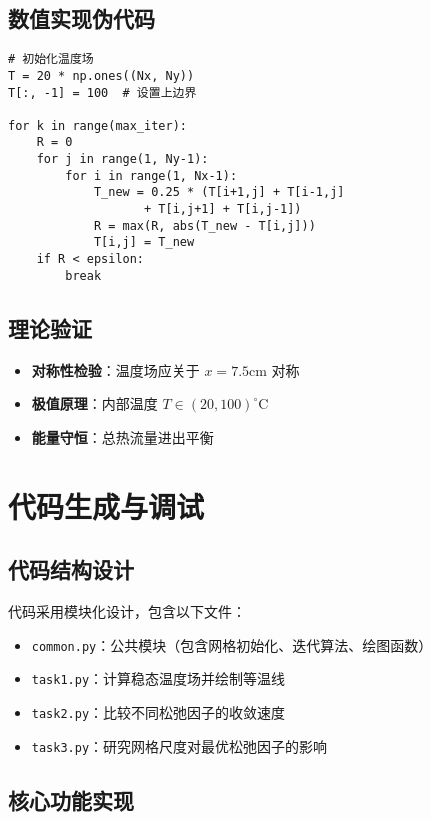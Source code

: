 \documentclass[UTF8]{ctexart}
\begin{document}
\subsection{数值实现伪代码}
\begin{verbatim}
# 初始化温度场
T = 20 * np.ones((Nx, Ny))
T[:, -1] = 100  # 设置上边界

for k in range(max_iter):
    R = 0
    for j in range(1, Ny-1):
        for i in range(1, Nx-1):
            T_new = 0.25 * (T[i+1,j] + T[i-1,j] 
                   + T[i,j+1] + T[i,j-1])
            R = max(R, abs(T_new - T[i,j]))
            T[i,j] = T_new
    if R < epsilon:
        break
\end{verbatim}

\subsection{理论验证}
\begin{itemize}
    \item \textbf{对称性检验}：温度场应关于 $ x=7.5\text{cm} $ 对称
    \item \textbf{极值原理}：内部温度 $ T \in (20,100)^\circ \text{C} $ \\
    \item \textbf{能量守恒}：总热流量进出平衡
\end{itemize}

\section{代码生成与调试}

\subsection{代码结构设计}
代码采用模块化设计，包含以下文件：

\begin{itemize}[leftmargin=2cm]
    \item \texttt{common.py}：公共模块（包含网格初始化、迭代算法、绘图函数）
    \item \texttt{task1.py}：计算稳态温度场并绘制等温线
    \item \texttt{task2.py}：比较不同松弛因子的收敛速度
    \item \texttt{task3.py}：研究网格尺度对最优松弛因子的影响
\end{itemize}

\subsection{核心功能实现}
\end{document}
